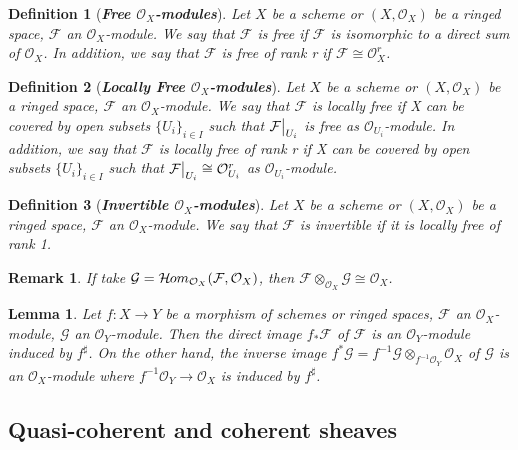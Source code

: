 \documentclass{ctexart}
\newtheorem{definition}{Definition}[section]
\newtheorem{remark}{Remark}[section]
\newtheorem{lemma}{Lemma}[section]
\newcommand{\sheafhom}{\mathcal{H}\kern -.5pt om}
\begin{document}
\begin{definition}[\textbf{\emph{Free $\mathcal{O}_{X}$-modules}}]
    Let $X$ be a scheme or $(X, \mathcal{O}_{X})$ be a ringed space, $\mathcal{F}$ an $\mathcal{O}_{X}$-module.
    We say that $\mathcal{F}$ is free if $\mathcal{F}$ is isomorphic to a direct sum of $\mathcal{O}_{X}$.
    In addition, we say that $\mathcal{F}$ is free of rank r if $\mathcal{F} \cong \mathcal{O}_{X}^{r}$.
\end{definition}
\begin{definition}[\textbf{\emph{Locally Free $\mathcal{O}_{X}$-modules}}]
    Let $X$ be a scheme or $(X, \mathcal{O}_{X})$ be a ringed space, $\mathcal{F}$ an $\mathcal{O}_{X}$-module.
    We say that $\mathcal{F}$ is locally free if X can be covered by open subsets $\{U_{i}\}_{i\in I}$ such that $\mathcal{F}\big{|}_{U_{i}}$ is free as $\mathcal{O}_{U_{i}}$-module.
    In addition, we say that $\mathcal{F}$ is locally free of rank r if X can be covered by open subsets $\{U_{i}\}_{i\in I}$ such that $\mathcal{F}\big{|}_{U_{i}} \cong \mathcal{O}_{U_{i}}^{r}$ as $\mathcal{O}_{U_{i}}$-module.
\end{definition}
\begin{definition}[\textbf{\emph{Invertible $\mathcal{O}_{X}$-modules}}]
    Let $X$ be a scheme or $(X, \mathcal{O}_{X})$ be a ringed space, $\mathcal{F}$ an $\mathcal{O}_{X}$-module.
    We say that $\mathcal{F}$ is invertible if it is locally free of rank 1.
\end{definition}
\begin{remark}
    If take $\mathcal{G} = \sheafhom_{\mathcal{O}_{X}}(\mathcal{F}, \mathcal{O}_{X})$, then $\mathcal{F} \otimes_{\mathcal{O}_{X}} \mathcal{G} \cong \mathcal{O}_{X}$.
\end{remark}
\begin{lemma}
    Let $f: X \longrightarrow Y$ be a morphism of schemes or ringed spaces, $\mathcal{F}$ an $\mathcal{O}_{X}$-module, $\mathcal{G}$ an $\mathcal{O}_{Y}$-module.
    Then the direct image $f_{\ast}\mathcal{F}$ of $\mathcal{F}$ is an $\mathcal{O}_{Y}$-module induced by $f^{\sharp}$.
    On the other hand, the inverse image $f^{\ast}\mathcal{G} = f^{-1}\mathcal{G} \otimes_{f^{-1}\mathcal{O}_{Y}} \mathcal{O}_{X}$ of $\mathcal{G}$ is an $\mathcal{O}_{X}$-module where $f^{-1}\mathcal{O}_{Y} \longrightarrow \mathcal{O}_{X}$ is induced by $f^{\sharp}$.
    \label{Lemma 6.1}
\end{lemma}

\subsection{Quasi-coherent and coherent sheaves}
\label{subsection:Sheaves_of_Modules_Quasi-coherent_and_coherent_sheaves}
\end{document}
